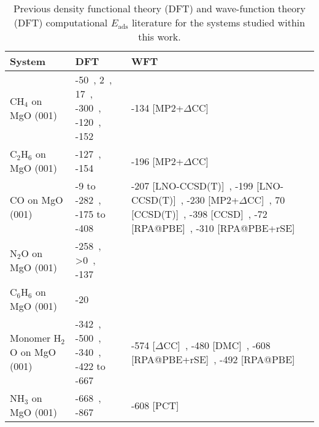 \begin{table}

\caption{\label{tab:comp_lit}Previous density functional theory (DFT) and wave-function theory (DFT) computational $E_\textrm{ads}$ literature for the systems studied within this work.}
\begin{adjustbox}{center}
\begin{tabular}{lp{7cm}p{7cm}}
\toprule
System & DFT & WFT \\ 
\midrule
CH$_4$ on MgO (001) & -50~\cite{trevethanBuildingBlocksMolecular2007}, 2~\cite{todnemMolecularAdsorptionMethane1999a}, 17~\cite{ferrariFTIRSpectroscopicDensity1998}, -300~\cite{manaeActivationCO2CH42022}, -120~\cite{mazheikaNiSubstitutionalDefects2016a}, -152~\cite{picciniEffectAnharmonicityAdsorption2014} & -134 [MP2+$\Delta$CC]~\cite{boeseAccurateAdsorptionEnergies2016} \\
C$_2$H$_6$ on MgO (001) & -127~\cite{boeseAccurateAdsorptionEnergies2016}, -154~\cite{boeseAccurateAdsorptionEnergies2016} & -196 [MP2+$\Delta$CC]~\cite{boeseAccurateAdsorptionEnergies2016} \\
CO on MgO (001) & -9 to -282~\cite{valeroGoodPerformanceM062008e}, -175 to -408~\cite{r.rehakIncludingDispersionDensity2020} & -207 [LNO-CCSD(T)]~\cite{yeAdsorptionVibrationalSpectroscopy2024a}, -199 [LNO-CCSD(T)]~\cite{shiManyBodyMethodsSurface2023a}, -230 [MP2+$\Delta$CC]~\cite{alessioChemicallyAccurateAdsorption2018}, 70 [CCSD(T)]~\cite{mazheikaNiSubstitutionalDefects2016}, -398 [CCSD]~\cite{mitraPeriodicDensityMatrix2022a}, -72 [RPA@PBE]~\cite{bajdichSurfaceEnergeticsAlkalineearth2015b}, -310 [RPA@PBE+rSE]~\cite{bajdichSurfaceEnergeticsAlkalineearth2015b} \\
N$_2$O on MgO (001) & -258~\cite{huesgesDispersionCorrectedDFT2014}, >0~\cite{scagnelliCatalyticDissociationN2O2006}, -137~\cite{huesgesDispersionCorrectedDFT2014} &  \\
C$_6$H$_6$ on MgO (001) & -20~\cite{trevethanBuildingBlocksMolecular2007} &  \\
Monomer H$_2$O on MgO (001) & -342~\cite{giordanoPartialDissociationWater1998a}, -500~\cite{carrascoDynamicIonPairs2008}, -340~\cite{huTrendsWaterMonomer2011}, -422 to -667~\cite{kebedeComparingVanWaals2017} & -574 [$\Delta$CC]~\cite{alessioChemicallyAccurateAdsorption2018}, -480 [DMC]~\cite{karaltiAdsorptionWaterMolecule2012}, -608 [RPA@PBE+rSE]~\cite{bajdichSurfaceEnergeticsAlkalineearth2015b}, -492 [RPA@PBE]~\cite{bajdichSurfaceEnergeticsAlkalineearth2015b} \\
NH$_3$ on MgO (001) & -668~\cite{pughEnergeticsNH3Adsorption1994}, -867~\cite{nakajimaAmmoniaAdsorptionMgO1996a} & -608 [PCT]~\cite{alloucheVibrationalInfraredSpectrum1995} \\

\end{tabular}
\end{adjustbox}
\end{table}
